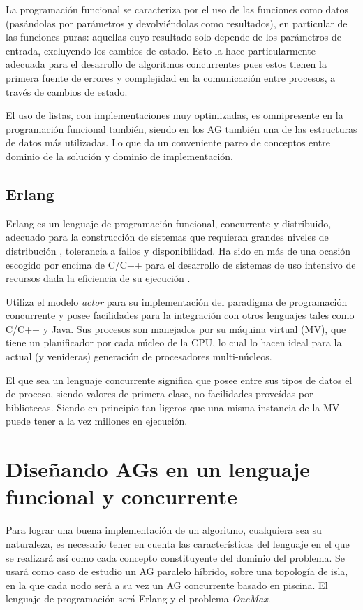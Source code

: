 \documentclass[runningheads]{llncs}
\begin{document}
La programación funcional se caracteriza por el uso de las funciones como datos (pasándolas por parámetros y devolviéndolas como resultados), en particular de las funciones puras: aquellas cuyo resultado solo depende de los parámetros de entrada, excluyendo los cambios de estado. Esto la hace particularmente adecuada para el desarrollo de algoritmos concurrentes pues estos tienen la primera fuente de errores y complejidad en la comunicación entre procesos, a través de cambios de estado.

El uso de listas, con implementaciones muy optimizadas, es omnipresente en la programación funcional también, siendo en los AG también una de las estructuras de datos más utilizadas. Lo que da un conveniente pareo de conceptos entre dominio de la solución y dominio de implementación.

\subsection{Erlang}


Erlang es un lenguaje de programación funcional, concurrente y
distribuido, adecuado para la construcción de sistemas que requieran
grandes niveles de distribución \cite{veldstra:_welcom_erlan}, tolerancia a fallos y
disponibilidad. Ha sido en más de una ocasión escogido por encima de
C/C++ para el desarrollo de sistemas de uso intensivo de recursos
\cite{Cesarini2009} dada la eficiencia de su ejecución \cite{erlang:future}. 

Utiliza el modelo {\em actor} para su implementación del paradigma de programación concurrente y posee facilidades para la integración con otros lenguajes tales como C/C++ y Java. Sus procesos son manejados por su máquina virtual (MV), que tiene un planificador por cada núcleo de la CPU, lo cual lo hacen ideal para la actual (y venideras) generación de procesadores multi-núcleos.

El que sea un lenguaje concurrente significa que posee entre sus tipos de datos el de proceso, siendo valores de primera clase, no facilidades proveídas por bibliotecas. Siendo en principio tan ligeros que una misma instancia de la MV puede tener a la vez millones en ejecución.

\section{Diseñando AGs en un lenguaje funcional y concurrente}
\label{sec:design}

Para lograr una buena implementación de un algoritmo, cualquiera sea su naturaleza, es necesario tener en cuenta las características del lenguaje en el que se realizará así como cada concepto constituyente del dominio del problema. Se usará como caso de estudio un AG paralelo híbrido, sobre una topología de isla, en la que cada nodo será a su vez un AG concurrente basado en piscina. El lenguaje de programación será Erlang y el problema {\em OneMax}.
\end{document}
